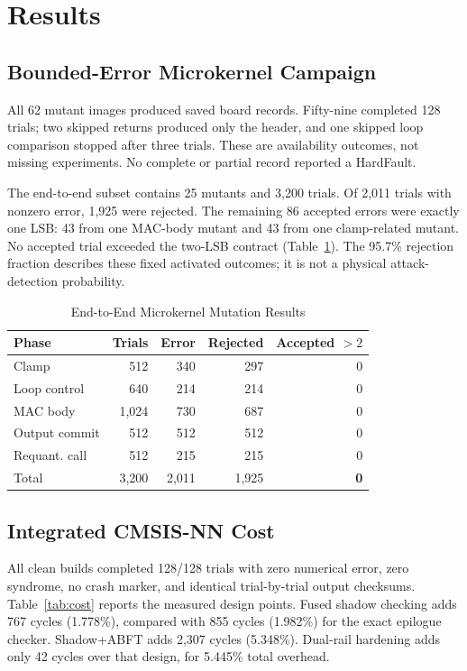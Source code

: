\documentclass[conference]{IEEEtran}
\begin{document}
\section{Results}
\subsection{Bounded-Error Microkernel Campaign}
All 62 mutant images produced saved board records. Fifty-nine completed 128 trials; two skipped returns produced only the header, and one skipped loop comparison stopped after three trials. These are availability outcomes, not missing experiments. No complete or partial record reported a HardFault.

The end-to-end subset contains 25 mutants and 3,200 trials. Of 2,011 trials with nonzero error, 1,925 were rejected. The remaining 86 accepted errors were exactly one LSB: 43 from one MAC-body mutant and 43 from one clamp-related mutant. No accepted trial exceeded the two-LSB contract (Table~\ref{tab:micro}). The 95.7\% rejection fraction describes these fixed activated outcomes; it is not a physical attack-detection probability.

\begin{table}[t]
\caption{End-to-End Microkernel Mutation Results}
\label{tab:micro}
\centering
\begin{tabular}{lrrrr}
\toprule
Phase & Trials & Error & Rejected & Accepted $>2$\\
\midrule
Clamp & 512 & 340 & 297 & 0\\
Loop control & 640 & 214 & 214 & 0\\
MAC body & 1,024 & 730 & 687 & 0\\
Output commit & 512 & 512 & 512 & 0\\
Requant. call & 512 & 215 & 215 & 0\\
\midrule
Total & 3,200 & 2,011 & 1,925 & \textbf{0}\\
\bottomrule
\end{tabular}
\end{table}

\subsection{Integrated CMSIS-NN Cost}
All clean builds completed 128/128 trials with zero numerical error, zero syndrome, no crash marker, and identical trial-by-trial output checksums. Table~\ref{tab:cost} reports the measured design points. Fused shadow checking adds 767 cycles (1.778\%), compared with 855 cycles (1.982\%) for the exact epilogue checker. Shadow+ABFT adds 2,307 cycles (5.348\%). Dual-rail hardening adds only 42 cycles over that design, for 5.445\% total overhead.
\end{document}

